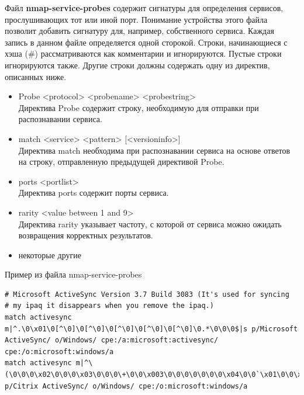 \documentclass[10pt,a4paper,titlepage]{article}
\begin{document}
Файл \textbf{nmap-service-probes} содержит сигнатуры для определения сервисов, прослушивающих тот или иной порт. Понимание устройства этого файла позволит добавить сигнатуру для, например, собственного сервиса. Каждая запись в данном файле определяется одной сторокой. Строки, начинающиеся с хэша (\#) рассматриваются как комментарии и игнорируются. Пустые строки игнорируются также. Другие строки должны содержать одну из директив, описанных ниже.

\begin{itemize}
\item Probe <protocol> <probename> <probestring> \\ Директива Probe содержит строку, необходимую для отправки при распознавании сервиса.
\item match <service> <pattern> [<versioninfo>]\\
Директива match необходима при распознавании сервиса на основе ответов на строку, отправленную предыдущей директивой Probe.
\item ports <portlist>\\
Директива ports содержит порты сервиса.
\item rarity <value between 1 and 9> \\
Директива rarity указывает частоту, с которой от сервиса можно ожидать возвращения корректных результатов.
\item некоторые другие
\end{itemize}
Пример из файла nmap-service-probes
\begin{verbatim}
# Microsoft ActiveSync Version 3.7 Build 3083 (It's used for syncing
# my ipaq it disappears when you remove the ipaq.)
match activesync m|^.\0\x01\0[^\0]\0[^\0]\0[^\0]\0[^\0]\0[^\0]\0.*\0\0\0$|s p/Microsoft ActiveSync/ o/Windows/ cpe:/a:microsoft:activesync/ cpe:/o:microsoft:windows/a
match activesync m|^\(\0\0\0\x02\0\0\0\x03\0\0\0\+\0\0\x003\0\0\0\0\0\0\0\x04\0\0`\x01\0\0\xff\0\0\0\0\0\0\0\0\0\0\0$|s p/Citrix ActiveSync/ o/Windows/ cpe:/o:microsoft:windows/a
\end{verbatim}	
\end{document}
